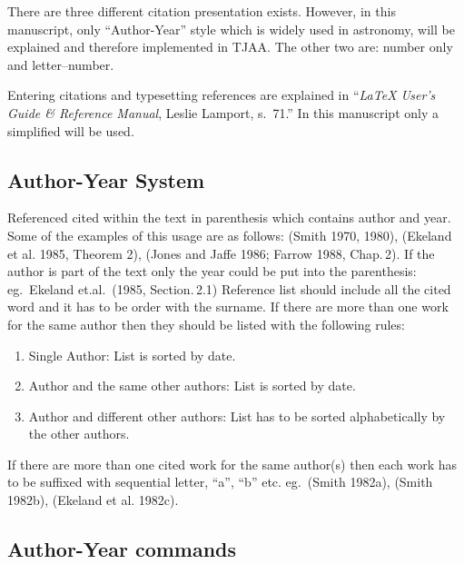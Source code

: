 \documentclass[usenatbib]{tjaa}
\begin{document}
There are three different citation presentation exists.
However, in this manuscript, only ``Author-Year'' style which is widely
used in astronomy, will be explained and therefore implemented in TJAA.
The other two are: number only and letter--number.

Entering citations and typesetting references are explained in
``{\em \LaTeX{} User's Guide \& Reference Manual\/}, Leslie Lamport, s.~71.''
In this manuscript only a simplified will be used.

\newpage
\subsection{Author-Year System}

Referenced cited within the text in parenthesis which contains author and
year.
Some of the examples of this usage are as follows:
(Smith 1970, 1980), (Ekeland et al. 1985, Theorem 2), (Jones and Jaffe
1986; Farrow 1988, Chap.\,2).
If the author is part of the text only the year could be put into the
parenthesis:
eg.\ Ekeland et.al.\ (1985, Section.\,2.1)
Reference list should include all the cited word and it has to be order with
the surname.
If there are more than one work for the same author then they should be listed
with the following rules:
\begin{enumerate}
\setlength{\hfuzz}{5pt}
\item
Single Author: List is sorted by date.
\item
Author and the same other authors: List is sorted by date.
\item
Author and different other authors: List has to be sorted alphabetically by
the other authors.
\end{enumerate}
If there are more than one cited work for the same author(s) then each work
has to be suffixed with sequential letter, ``a'', ``b'' etc.
eg.\ (Smith 1982a), (Smith 1982b), (Ekeland et al. 1982c).

\subsection{Author-Year commands}
\end{document}
